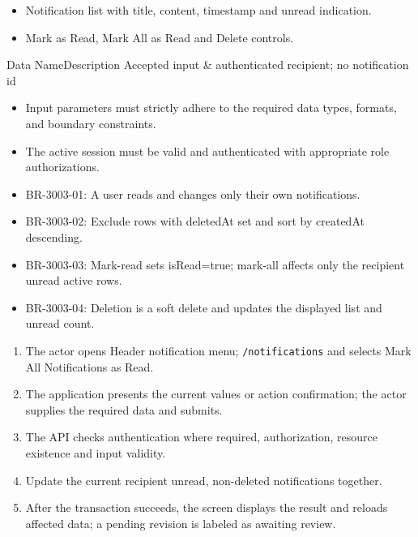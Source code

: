 \begin{itemize}[leftmargin=1.6em,topsep=3pt,itemsep=2pt,parsep=0pt,label=$\bullet$]
    \item Notification list with title, content, timestamp and unread indication.
    \item Mark as Read, Mark All as Read and Delete controls.
\end{itemize}


\begin{specdatatable}{Data Name}{Description}
Accepted input & authenticated recipient; no notification id\\ \hline
\end{specdatatable}

\begin{itemize}[leftmargin=1.6em,topsep=3pt,itemsep=2pt,parsep=0pt,label=$\bullet$]
    \item Input parameters must strictly adhere to the required data types, formats, and boundary constraints.
    \item The active session must be valid and authenticated with appropriate role authorizations.
\end{itemize}

\begin{itemize}[leftmargin=1.6em,topsep=3pt,itemsep=2pt,parsep=0pt,label=$\bullet$]\brrulelist
    \item BR-3003-01: A user reads and changes only their own notifications.
    \item BR-3003-02: Exclude rows with deletedAt set and sort by createdAt descending.
    \item BR-3003-03: Mark-read sets isRead=true; mark-all affects only the recipient unread active rows.
    \item BR-3003-04: Deletion is a soft delete and updates the displayed list and unread count.
\end{itemize}

\begin{enumerate}[leftmargin=1.8em,topsep=3pt,itemsep=2pt,parsep=0pt]
    \item The actor opens Header notification menu; \texttt{/\allowbreak{}notifications} and selects Mark All Notifications as Read.
    \item The application presents the current values or action confirmation; the actor supplies the required data and submits.
    \item The API checks authentication where required, authorization, resource existence and input validity.
    \item Update the current recipient unread, non-deleted notifications together.
    \item After the transaction succeeds, the screen displays the result and reloads affected data; a pending revision is labeled as awaiting review.
\end{enumerate}

